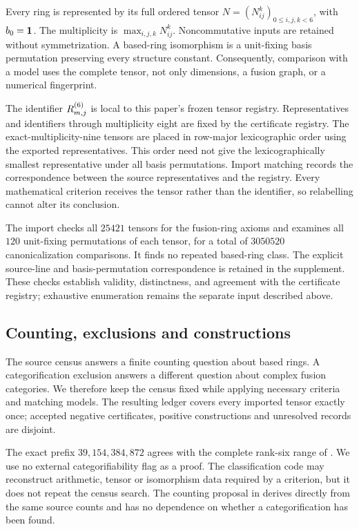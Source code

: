 Every ring is represented by its full ordered tensor
$N=(N_{ij}^{k})_{0\leq i,j,k<6}$, with $b_0=\mathbf1$. The multiplicity is
$\max_{i,j,k}N_{ij}^{k}$. Noncommutative inputs are retained without
symmetrization. A based-ring isomorphism is a unit-fixing basis
permutation preserving every structure constant. Consequently,
comparison with a model uses the complete tensor, not only dimensions,
a fusion graph, or a numerical fingerprint.

The identifier $R^{(6)}_{m,j}$ is local to this paper's frozen tensor
registry. Representatives and identifiers through multiplicity eight
are fixed by the certificate registry.
The exact-multiplicity-nine tensors are placed in
row-major lexicographic order using the exported representatives.
This order need not give the lexicographically smallest representative
under all basis permutations. Import matching records the correspondence
between the source representatives and the registry. Every mathematical
criterion receives the tensor rather than the identifier, so relabelling
cannot alter its conclusion.

The import checks all $25421$ tensors for the fusion-ring axioms and
examines all $120$ unit-fixing permutations of each tensor, for a total of
$3050520$ canonicalization comparisons. It finds no repeated based-ring
class. The explicit source-line and basis-permutation correspondence is
retained in the supplement. These checks establish validity, distinctness,
and agreement with the certificate registry; exhaustive enumeration remains
the separate input described above.

\subsection{Counting, exclusions and constructions}
The source census answers a finite counting question about based rings.
A categorification exclusion answers a different question about complex
fusion categories. We therefore keep the census fixed while applying
necessary criteria and matching models. The resulting ledger covers
every imported tensor exactly once; accepted negative certificates,
positive constructions and unresolved records are disjoint.

The exact prefix $39,154,384,872$ agrees with the complete rank-six range
of \cite{VS}. We use no external categorifiability flag as a proof.
The classification code may reconstruct arithmetic, tensor or
isomorphism data required by a criterion, but it does not repeat the
census search. The counting proposal in  derives directly
from the same source counts and has no dependence on whether a
categorification has been found.
